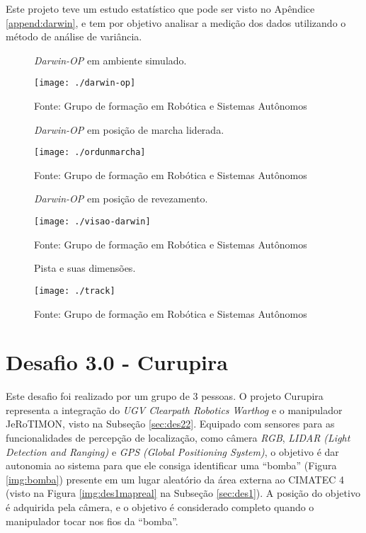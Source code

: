 Este projeto teve um estudo estatístico que pode ser visto no Apêndice \ref{append:darwin}, e tem por objetivo analisar a medição dos dados utilizando o método de análise de variância.

\begin{figure} [H]												
    \centering
    \caption{\textit{Darwin-OP} em ambiente simulado.}	
	\texttt{[image: ./darwin-op]}	
	\caption*{Fonte: Grupo de formação em Robótica e Sistemas Autônomos}
	\label{img:darwin}									 
\end{figure}

\begin{figure} [H]												
    \centering
    \caption{\textit{Darwin-OP} em posição de marcha liderada.}	
	\texttt{[image: ./ordunmarcha]}	
	\caption*{Fonte: Grupo de formação em Robótica e Sistemas Autônomos}
	\label{img:marcha}									 
\end{figure}

\begin{figure} [H]												
    \centering
    \caption{\textit{Darwin-OP} em posição de revezamento.}	
	\texttt{[image: ./visao-darwin]}	
	\caption*{Fonte: Grupo de formação em Robótica e Sistemas Autônomos}
	\label{img:revezamento}									 
\end{figure}

\begin{figure} [H]												
    \centering
    \caption{Pista e suas dimensões.}	
	\texttt{[image: ./track]}	
	\caption*{Fonte: Grupo de formação em Robótica e Sistemas Autônomos}
	\label{img:pista}									 
\end{figure}

\section{Desafio 3.0 - Curupira}
\label{sec:des3}

Este desafio foi realizado por um grupo de 3 pessoas. O projeto Curupira representa a integração do \textit{UGV Clearpath Robotics Warthog} e o manipulador JeRoTIMON, visto na Subseção \ref{sec:des22}. Equipado com sensores para as funcionalidades de percepção de localização, como câmera \textit{RGB}, \textit{LIDAR (Light Detection and Ranging)} e \textit{GPS (Global Positioning System)}, o objetivo é dar autonomia ao sistema para que ele consiga identificar uma ``bomba'' (Figura \ref{img:bomba}) presente em um lugar aleatório da área externa ao CIMATEC 4 (visto na Figura \ref{img:des1mapreal} na Subseção \ref{sec:des1}). A posição do objetivo é adquirida pela câmera, e o objetivo é considerado completo quando o manipulador tocar nos fios da ``bomba''.

